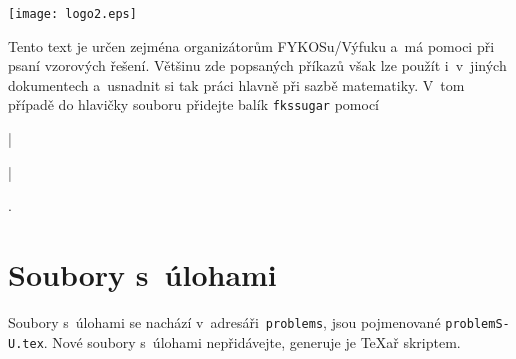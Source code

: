 \documentclass[fykos]{fksbase}
\newenvironment{texsource}
	{\VerbatimEnvironment\begin{mdframed}[backgroundcolor=mintedbg]%
		\hskip-16pt\begin{texminted}}
	{\end{texminted}\hskip-40pt\end{mdframed}}
\begin{document}
\begin{center}
	\texttt{[image: logo2.eps]}
	\hspace{10pt}
	\vskip0.6cm
\end{center}

Tento text je určen zejména organizátorům FYKOSu/Výfuku a~má pomoci při psaní
vzorových řešení. Většinu zde popsaných příkazů však lze použít i~v~jiných
dokumentech a~usnadnit si tak práci hlavně při sazbě matematiky. V~tom případě
do hlavičky souboru přidejte balík \texttt{fkssugar}
pomocí~{\texinline|\usepackage{fkssugar}|}.

\section{Soubory s~úlohami}

Soubory s~úlohami se nachází v~adresáři~\texttt{problems}, jsou pojmenované
\texttt{problemS-U.tex}. Nové soubory s~úlohami nepřidávejte, generuje je TeXař
skriptem.

\begin{texsource}
\probsolution{%
}
\end{texsource}
\end{document}
